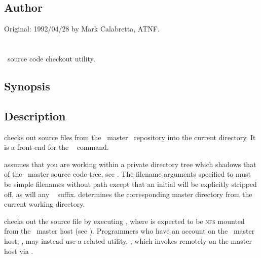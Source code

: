 \subsection*{Author}

Original: 1992/04/28 by Mark Calabretta, ATNF.


\newpage
\section{}
\label{ao}

\aipspp\ source code checkout utility.

\subsection*{Synopsis}

\begin{synopsis}
\end{synopsis}

\subsection*{Description}

 checks out source files from the \aipspp\ master \rcs\ repository
into the current directory.  It is a front-end for the \rcs\ 
command.

 assumes that you are working within a private directory tree which
shadows that of the \aipspp\ master source code tree, see .
The filename arguments specified to  must be simple filenames without
path except that an initial  will be explicitly stripped off, as
will any \rcs\  suffix.   determines the corresponding master
directory from the current working directory.

 checks out the source file by executing ,
where  is expected to be \textsc{nfs} mounted from the
\aipspp\ master host (see ).  Programmers who have an
account on the \aipspp\ master host, , may instead use a
related utility, , which invokes  remotely on the master
host via .

